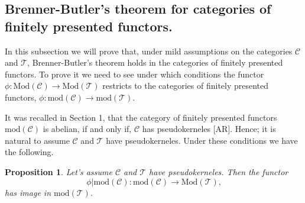 \documentclass{amsart}
\theoremstyle{plain}
\newtheorem{proposition}{Proposition}
\numberwithin{equation}{section}
\begin{document}
\subsection{Brenner-Butler's theorem for categories of finitely presented
functors.}

In this subsection we will prove that, under mild assumptions on the
categories $\mathcal{C}$ and $\mathcal{T}$, Brenner-Butler's theorem holds
in the categories of finitely presented functors. To prove it we need to see
under which conditions the functor $\phi :\mathrm{\mathrm{Mod}}(\mathcal{C})\rightarrow \mathrm{\mathrm{Mod}}(\mathcal{T})$ restricts to the categories
of finitely presented functors, $\phi :\mathrm{mod}(\mathcal{C})\rightarrow
\mathrm{mod}(\mathcal{T})$.

It was recalled in Section 1, that the category of finitely presented
functors $\mathrm{mod}(\mathcal{C})$ is abelian, if and only if, $\mathcal{C}
$ has pseudokerneles [AR]. Hence; it is natural to assume $\mathcal{C}$ and $\mathcal{T}$ have pseudokerneles. Under these conditions we have the
following.

\begin{proposition}
\label{R2} Let's assume $\mathcal{C}$ and $\mathcal{T}$ have pseudokerneles.
Then the functor
\begin{equation*}
\phi |\mathrm{mod}(\mathcal{C}):\mathrm{mod}(\mathcal{C})\rightarrow \mathrm{\mathrm{Mod}}(\mathcal{T})\text{,}
\end{equation*}has image in $\mathrm{mod}(\mathcal{T})$.
\end{proposition}
\end{document}
